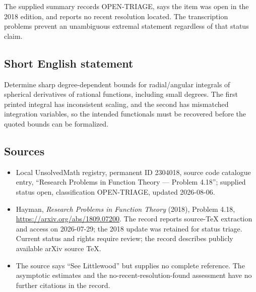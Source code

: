\documentclass[11pt]{article}
\begin{document}
The supplied summary records OPEN-TRIAGE, says the item was open in the 2018 edition, and reports no recent resolution located. The transcription problems prevent an unambiguous extremal statement regardless of that status claim.
\subsection{Short English statement}
Determine sharp degree-dependent bounds for radial/angular integrals of spherical derivatives of rational functions, including small degrees. The first printed integral has inconsistent scaling, and the second has mismatched integration variables, so the intended functionals must be recovered before the quoted bounds can be formalized.
\subsection{Sources}
\begin{itemize}
\item Local UnsolvedMath registry, permanent ID 2304018, source code catalogue entry, ``Research Problems in Function Theory --- Problem 4.18''; supplied status open, classification OPEN-TRIAGE, updated 2026-08-06.
\item Hayman, \emph{Research Problems in Function Theory} (2018), Problem 4.18, \url{https://arxiv.org/abs/1809.07200}. The record reports source-TeX extraction and access on 2026-07-29; the 2018 update was retained for status triage. Current status and rights require review; the record describes publicly available arXiv source TeX.
\item The source says ``See Littlewood'' but supplies no complete reference. The asymptotic estimates and the no-recent-resolution-found assessment have no further citations in the record.
\end{itemize}
\end{document}
